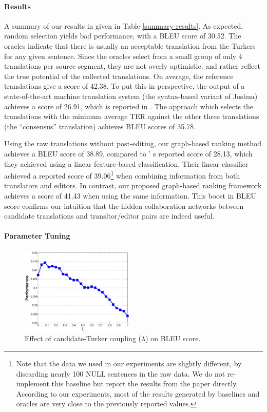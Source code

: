 \documentclass[11pt]{article}
\begin{document}
\paragraph{Results}

A summary of our results in given in Table \ref{summary-results}. As expected, random selection yields bad performance, with a BLEU score of 30.52. The oracles indicate that there is usually an acceptable translation from the Turkers for any given sentence. Since the oracles select from a small group of only 4 translations per source segment, they are not overly optimistic, and rather reflect the true potential of the collected translations. On average, the reference translations give a score of 42.38. To put this in perspective, the output of a state-of-the-art machine translation system (the syntax-based variant of Joshua) achieves a score of 26.91, which is reported in \cite{zaidan-callisonburch:2011:ACL-HLT2011a}. The approach which selects the translations with the minimum average TER \cite{a18} against the other three translations (the ``consensus'' translation) achieves BLEU scores of 35.78.

Using the raw translations without post-editing, our graph-based ranking method achieves a BLEU score of  38.89, compared to ' s reported score of 28.13, which they achieved using a linear feature-based classification. Their linear classifier achieved a reported score of 39.06\footnote{Note that the data we used in our experiments are slightly different, by discarding nearly 100 NULL sentences in the raw data. We do not re-implement this baseline but report the results from the paper directly. According to our experiments, most of the results generated by baselines and oracles are very close to the previously reported values.} when combining information from both translators and editors. In contrast, our proposed graph-based ranking framework achieves a score of 41.43 when using the same information. This boost in BLEU score confirms our intuition that the hidden collaboration networks between candidate translations and transltor/editor pairs are indeed useful.

\paragraph{Parameter Tuning}

\begin{figure}[t]
  \centering
  \includegraphics[width=0.48\textwidth]{parameters}
  \caption{Effect of candidate-Turker coupling ($\lambda$) on BLEU score.}
  \label{lambda}
\end{figure}
\end{document}
